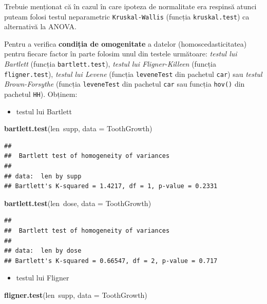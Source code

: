 \documentclass[]{article}
\newenvironment{Shaded}{\begin{snugshade}}{\end{snugshade}}
\newcommand{\KeywordTok}[1]{\textcolor[rgb]{0.13,0.29,0.53}{\textbf{{#1}}}}
\newcommand{\DataTypeTok}[1]{\textcolor[rgb]{0.13,0.29,0.53}{{#1}}}
\newcommand{\NormalTok}[1]{{#1}}
\providecommand{\tightlist}{%
  \setlength{\itemsep}{0pt}\setlength{\parskip}{0pt}}
\begin{document}
Trebuie menționat că în cazul în care ipoteza de normalitate era
respinsă atunci puteam folosi testul neparametric
\texttt{Kruskal-Wallis} (funcția \texttt{kruskal.test}) ca alternativă
la ANOVA.

Pentru a verifica \textbf{condiția de omogenitate} a datelor
(homoscedasticitatea) pentru fiecare factor în parte folosim unul din
testele următoare: \emph{testul lui Bartlett} (funcția
\texttt{bartlett.test}), \emph{testul lui Fligner-Killeen} (funcția
\texttt{fligner.test}), \emph{testul lui Levene} (funcția
\texttt{leveneTest} din pachetul \texttt{car}) sau \emph{testul
Brown-Forsythe} (funcția \texttt{leveneTest} din pachetul \texttt{car}
sau funcția \texttt{hov()} din pachetul \texttt{HH}). Obținem:

\begin{itemize}
\tightlist
\item
  testul lui Bartlett
\end{itemize}

\begin{Shaded}
\begin{Highlighting}[]
\KeywordTok{bartlett.test}\NormalTok{(len~supp, }\DataTypeTok{data =} \NormalTok{ToothGrowth)}
\end{Highlighting}
\end{Shaded}

\begin{verbatim}
## 
##  Bartlett test of homogeneity of variances
## 
## data:  len by supp
## Bartlett's K-squared = 1.4217, df = 1, p-value = 0.2331
\end{verbatim}

\begin{Shaded}
\begin{Highlighting}[]
\KeywordTok{bartlett.test}\NormalTok{(len~dose, }\DataTypeTok{data =} \NormalTok{ToothGrowth)}
\end{Highlighting}
\end{Shaded}

\begin{verbatim}
## 
##  Bartlett test of homogeneity of variances
## 
## data:  len by dose
## Bartlett's K-squared = 0.66547, df = 2, p-value = 0.717
\end{verbatim}

\begin{itemize}
\tightlist
\item
  testul lui Fligner
\end{itemize}

\begin{Shaded}
\begin{Highlighting}[]
\KeywordTok{fligner.test}\NormalTok{(len~supp, }\DataTypeTok{data =} \NormalTok{ToothGrowth)}
\end{Highlighting}
\end{Shaded}
\end{document}
